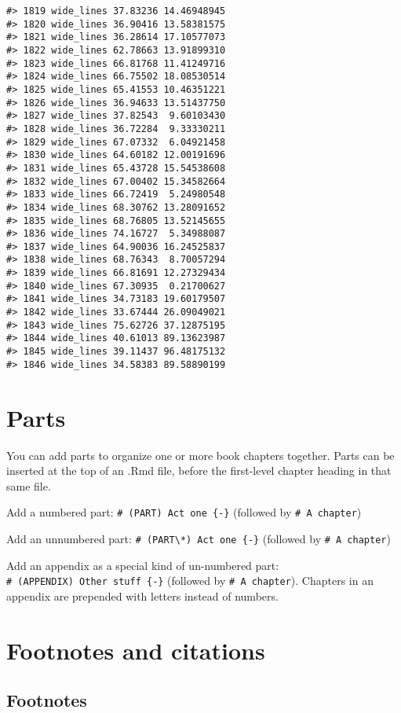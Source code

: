 \documentclass[
]{book}
\theoremstyle{definition}
\theoremstyle{definition}
\theoremstyle{definition}
\theoremstyle{definition}
\theoremstyle{remark}
\begin{document}
\begin{verbatim}
#> 1819 wide_lines 37.83236 14.46948945
#> 1820 wide_lines 36.90416 13.58381575
#> 1821 wide_lines 36.28614 17.10577073
#> 1822 wide_lines 62.78663 13.91899310
#> 1823 wide_lines 66.81768 11.41249716
#> 1824 wide_lines 66.75502 18.08530514
#> 1825 wide_lines 65.41553 10.46351221
#> 1826 wide_lines 36.94633 13.51437750
#> 1827 wide_lines 37.82543  9.60103430
#> 1828 wide_lines 36.72284  9.33330211
#> 1829 wide_lines 67.07332  6.04921458
#> 1830 wide_lines 64.60182 12.00191696
#> 1831 wide_lines 65.43728 15.54538608
#> 1832 wide_lines 67.00402 15.34582664
#> 1833 wide_lines 66.72419  5.24980548
#> 1834 wide_lines 68.30762 13.28091652
#> 1835 wide_lines 68.76805 13.52145655
#> 1836 wide_lines 74.16727  5.34988087
#> 1837 wide_lines 64.90036 16.24525837
#> 1838 wide_lines 68.76343  8.70057294
#> 1839 wide_lines 66.81691 12.27329434
#> 1840 wide_lines 67.30935  0.21700627
#> 1841 wide_lines 34.73183 19.60179507
#> 1842 wide_lines 33.67444 26.09049021
#> 1843 wide_lines 75.62726 37.12875195
#> 1844 wide_lines 40.61013 89.13623987
#> 1845 wide_lines 39.11437 96.48175132
#> 1846 wide_lines 34.58383 89.58890199
\end{verbatim}

\hypertarget{parts}{%
\chapter{Parts}\label{parts}}

You can add parts to organize one or more book chapters together. Parts can be inserted at the top of an .Rmd file, before the first-level chapter heading in that same file.

Add a numbered part: \texttt{\#\ (PART)\ Act\ one\ \{-\}} (followed by \texttt{\#\ A\ chapter})

Add an unnumbered part: \texttt{\#\ (PART\textbackslash{}*)\ Act\ one\ \{-\}} (followed by \texttt{\#\ A\ chapter})

Add an appendix as a special kind of un-numbered part: \texttt{\#\ (APPENDIX)\ Other\ stuff\ \{-\}} (followed by \texttt{\#\ A\ chapter}). Chapters in an appendix are prepended with letters instead of numbers.

\hypertarget{footnotes-and-citations}{%
\chapter{Footnotes and citations}\label{footnotes-and-citations}}

\hypertarget{footnotes}{%
\section{Footnotes}\label{footnotes}}
\end{document}
